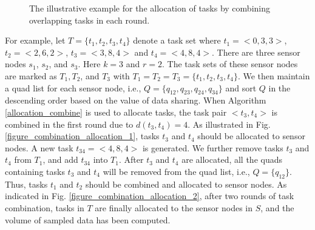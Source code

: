 \documentclass[prodmode,acmtosn]{acmsmall}
\begin{document}
\begin{figure}[t]
\centering
{}
\hspace{30pt}
\caption{The illustrative example for the allocation of tasks by combining overlapping tasks in each round.}
\label{figure_combination_allocation}
\end{figure}


For example, let $T\mathrm{=}\{t_1,t_2,t_3,t_4\}$ denote a task set where $t_1\mathrm{=<}0,3,3\mathrm{>}$, $t_2\mathrm{=<}2,6,2\mathrm{>}$, $t_3\mathrm{=<}3,8,4\mathrm{>}$ and $t_4\mathrm{=<}4,8,4\mathrm{>}$. There are three sensor nodes $s_1$, $s_2$, and $s_3$. Here $k\mathrm{=}3$ and $r\mathrm{=}2$. The task sets of these sensor nodes are marked as $T_1, T_2$, and $T_3$ with $T_1\mathrm{=}T_2\mathrm{=}T_3\mathrm{=}\{t_1,t_2,t_3,t_4\}$. We then maintain a quad list for each sensor node, i.e., $Q\mathrm{=}\{q_{12},q_{23},q_{24},q_{34}\}$ and sort $Q$  in the descending order based on the value of  data sharing. When Algorithm \ref{allocation_combine} is used to allocate tasks, the task pair $\mathrm{<}t_3,t_4\mathrm{>}$ is combined in the first round due to $d(t_3,t_4)\mathrm{=}4$. As illustrated in Fig. \ref{figure_combination_allocation_1}, tasks $t_3$ and $t_4$ should be allocated to sensor nodes. A new task $t_{34}\mathrm{=<}4,8,4\mathrm{>}$ is generated. We further remove tasks $t_3$ and $t_4$ from $T_1$, and add $t_{34}$ into $T_1$. After $t_3$ and $t_4$ are allocated, all the quads containing tasks $t_3$ and  $t_4$ will be removed from the quad list, i.e., $Q\mathrm{=}\{q_{12}\}$. Thus, tasks $t_1$ and $t_2$ should be combined and allocated to sensor nodes. As indicated in Fig. \ref{figure_combination_allocation_2}, after two rounds of task combination, tasks in $T$ are finally allocated to the sensor nodes in $S$, and the volume of sampled data has been computed.
\end{document}
